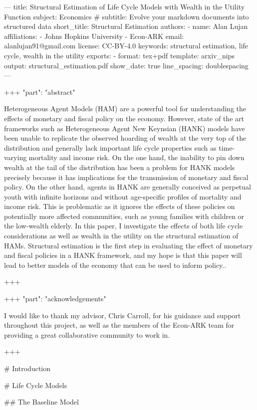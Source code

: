 ---
title: Structural Estimation of Life Cycle Models with Wealth in the Utility Function
subject: Economics
# subtitle: Evolve your markdown documents into structured data
short_title: Structural Estimation
authors:
- name: Alan Lujan
affiliations:
- Johns Hopkins University
- Econ-ARK
email: alanlujan91@gmail.com
license: CC-BY-4.0
keywords: structural estimation, life cycle, wealth in the utility
exports:
- format: tex+pdf
template: arxiv_nips
output: structural_estimation.pdf
show_date: true
line_spacing: doublespacing
---

+++ {"part": "abstract"}

Heterogeneous Agent Models (HAM) are a powerful tool for understanding the effects of monetary and fiscal policy on the economy. However, state of the art frameworks such as Heterogeneous Agent New Keynsian (HANK) models have been unable to replicate the observed hoarding of wealth at the very top of the distribution and generally lack important life cycle properties such as time-varying mortality and income risk. On the one hand, the inability to pin down wealth at the tail of the distribution has been a problem for HANK models precisely because it has implications for the transmission of monetary and fiscal policy. On the other hand, agents in HANK are generally conceived as perpetual youth with infinite horizons and without age-specific profiles of mortality and income risk. This is problematic as it ignores the effects of these policies on potentially more affected communities, such as young families with children or the low-wealth elderly. In this paper, I investigate the effects of both life cycle considerations as well as wealth in the utility on the structural estimation of HAMs. Structural estimation is the first step in evaluating the effect of monetary and fiscal policies in a HANK framework, and my hope is that this paper will lead to better models of the economy that can be used to inform policy..

+++

+++ {"part": "acknowledgements"}

I would like to thank my advisor, Chris Carroll, for his guidance and support throughout this project, as well as the members of the Econ-ARK team for providing a great collaborative community to work in.

+++

# Introduction

# Life Cycle Models

## The Baseline Model

